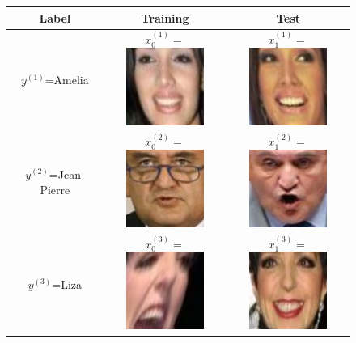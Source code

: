 \documentclass[twoside,11pt]{article}
\begin{document}
\begin{figure}[t]
\centering
\begin{tabular}{|c|c|c|}
\hline
Label & Training & Test\\ \hline
$y^{(1)}$=Amelia & 
  $x_0^{(1)} = $\includegraphics[scale = 0.2]{face_photos/Amelia_Vega_0001.png} &  
  $x_1^{(1)} = $\includegraphics[scale = 0.2]{face_photos/Amelia_Vega_0004.png} \\ \hline
$y^{(2)}$=Jean-Pierre & 
  $x_0^{(2)} = $\includegraphics[scale = 0.2]{face_photos/Jean-Pierre_Raffarin_0001.png} &  
  $x_1^{(2)} = $\includegraphics[scale = 0.2]{face_photos/Jean-Pierre_Raffarin_0004.png} \\ \hline
$y^{(3)}$=Liza & 
  $x_0^{(3)} = $\includegraphics[scale = 0.2]{face_photos/Liza_Minnelli_0001.png} &  
  $x_1^{(3)} = $\includegraphics[scale = 0.2]{face_photos/Liza_Minnelli_0004.png} \\ \hline

\end{tabular}
\end{figure}
\end{document}
